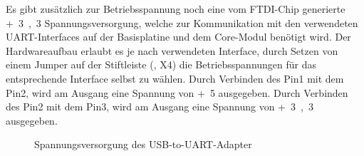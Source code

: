 Es gibt zusätzlich zur Betriebsspannung noch eine vom FTDI-Chip generierte \unit{+3,3}{\volt} Spannungsversorgung, welche zur Kommunikation mit den verwendeten UART-Interfaces auf der \gls{Basisplatine} und dem \gls{Core-Modul} benötigt wird. Der Hardwareaufbau erlaubt es je nach verwendeten Interface, durch Setzen von einem Jumper auf der Stiftleiste (, X4) die Betriebsspannungen für das entsprechende Interface selbst zu wählen. Durch Verbinden des Pin1 mit dem Pin2, wird am Ausgang eine Spannung von \unit{+5}{\volt} ausgegeben. Durch Verbinden des Pin2 mit dem Pin3, wird am Ausgang eine Spannung von \unit{+3,3}{\volt} ausgegeben.

\begin{figure}[htb]
    \centering
    \qquad
    \qquad
    \caption[Spannungsversorgung des USB-to-UART-Adapter]{Spannungsversorgung des \gls{USB-to-UART}-Adapter}
    \label{fig:usbtouart-spannung1}
\end{figure}

